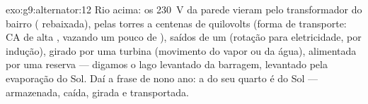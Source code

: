 \begin{solution}{exo:g9:alternator:12}
Rio acima: os \qty{230}{V} da parede vieram pelo transformador do
bairro ( rebaixada), pelas torres a centenas de quilovolts
(forma de transporte: CA de alta , vazando um pouco de ),
saídos de um  (rotação para eletricidade, por indução),
girado por uma turbina (movimento do vapor ou da água), alimentada
por uma reserva --- digamos o lago levantado da barragem, levantado
pela evaporação do Sol. Daí a frase de nono ano: a  do seu quarto
é  do Sol --- armazenada, caída, girada e transportada.
\end{solution}

